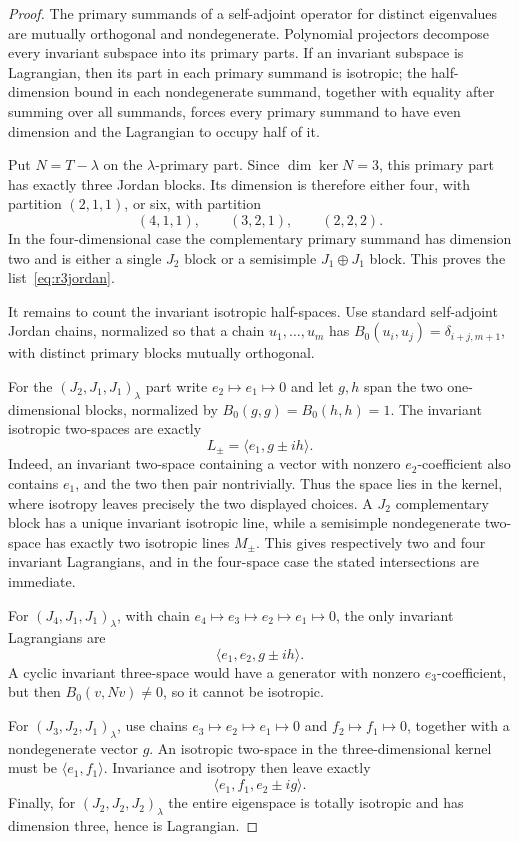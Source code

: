 \documentclass[11pt,reqno]{amsart}
\theoremstyle{remark}
\begin{document}
\begin{proof}
The primary summands of a self-adjoint operator for distinct eigenvalues are mutually orthogonal and nondegenerate.  Polynomial projectors decompose every invariant subspace into its primary parts.  If an invariant subspace is Lagrangian, then its part in each primary summand is isotropic; the half-dimension bound in each nondegenerate summand, together with equality after summing over all summands, forces every primary summand to have even dimension and the Lagrangian to occupy half of it.

Put $N=T-\lambda$ on the $\lambda$-primary part.  Since $\dim\ker N=3$, this primary part has exactly three Jordan blocks.  Its dimension is therefore either four, with partition $(2,1,1)$, or six, with partition
\[
(4,1,1),\qquad(3,2,1),\qquad(2,2,2).
\]
In the four-dimensional case the complementary primary summand has dimension two and is either a single $J_2$ block or a semisimple $J_1\oplus J_1$ block.  This proves the list~\eqref{eq:r3jordan}.

It remains to count the invariant isotropic half-spaces.  Use standard self-adjoint Jordan chains, normalized so that a chain $u_1,\ldots,u_m$ has $B_0(u_i,u_j)=\delta_{i+j,m+1}$, with distinct primary blocks mutually orthogonal.

For the $(J_2,J_1,J_1)_\lambda$ part write $e_2\mapsto e_1\mapsto0$ and let $g,h$ span the two one-dimensional blocks, normalized by $B_0(g,g)=B_0(h,h)=1$.  The invariant isotropic two-spaces are exactly
\[
L_\pm=\langle e_1,g\pm i h\rangle.
\]
Indeed, an invariant two-space containing a vector with nonzero $e_2$-coefficient also contains $e_1$, and the two then pair nontrivially.  Thus the space lies in the kernel, where isotropy leaves precisely the two displayed choices.  A $J_2$ complementary block has a unique invariant isotropic line, while a semisimple nondegenerate two-space has exactly two isotropic lines $M_\pm$.  This gives respectively two and four invariant Lagrangians, and in the four-space case the stated intersections are immediate.

For $(J_4,J_1,J_1)_\lambda$, with chain $e_4\mapsto e_3\mapsto e_2\mapsto e_1\mapsto0$, the only invariant Lagrangians are
\[
\langle e_1,e_2,g\pm ih\rangle.
\]
A cyclic invariant three-space would have a generator with nonzero $e_3$-coefficient, but then $B_0(v,Nv)\ne0$, so it cannot be isotropic.

For $(J_3,J_2,J_1)_\lambda$, use chains $e_3\mapsto e_2\mapsto e_1\mapsto0$ and $f_2\mapsto f_1\mapsto0$, together with a nondegenerate vector $g$.  An isotropic two-space in the three-dimensional kernel must be $\langle e_1,f_1\rangle$.  Invariance and isotropy then leave exactly
\[
\langle e_1,f_1,e_2\pm ig\rangle.
\]
Finally, for $(J_2,J_2,J_2)_\lambda$ the entire eigenspace is totally isotropic and has dimension three, hence is Lagrangian.
\end{proof}
\end{document}
